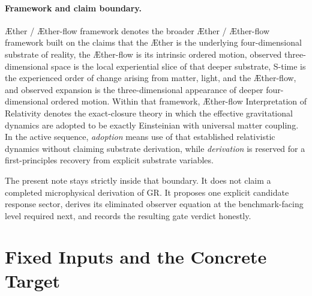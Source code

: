 \documentclass[11pt]{article}
\newcommand{\Aether}{\AE{}ther}
\newcommand{\Aflow}{\AE{}ther-flow}
\newcommand{\TheoryName}{\Aflow{} Interpretation of Relativity}
\newcommand{\TheoryProgram}{\Aether{} / \Aflow{} framework}
\begin{document}
\paragraph{Framework and claim boundary.}
\TheoryProgram{} denotes the broader \Aether{} / \Aflow{} framework built on the claims that the \Aether{} is the underlying four-dimensional substrate of reality, the \Aflow{} is its intrinsic ordered motion, observed three-dimensional space is the local experiential slice of that deeper substrate, S-time is the experienced order of change arising from matter, light, and the \Aflow{}, and observed expansion is the three-dimensional appearance of deeper four-dimensional ordered motion. Within that framework, \TheoryName{} denotes the exact-closure theory in which the effective gravitational dynamics are adopted to be exactly Einsteinian with universal matter coupling. In the active sequence, \emph{adoption} means use of that established relativistic dynamics without claiming substrate derivation, while \emph{derivation} is reserved for a first-principles recovery from explicit substrate variables.

The present note stays strictly inside that boundary. It does not claim a completed microphysical derivation of GR. It proposes one explicit candidate response sector, derives its eliminated observer equation at the benchmark-facing level required next, and records the resulting gate verdict honestly.

\section{Fixed Inputs and the Concrete Target}
\end{document}
